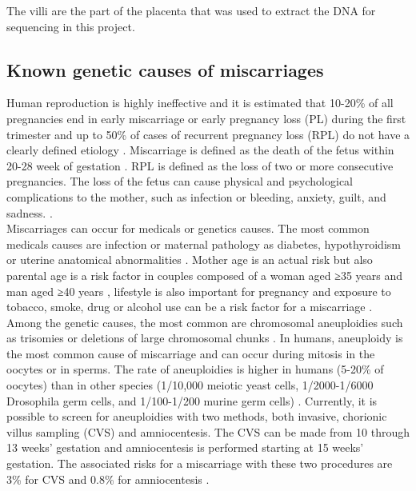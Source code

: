 The villi are the part of the placenta that was used to extract the DNA \cite{you2008multiple} for sequencing in this project. 


\subsection{Known genetic causes of miscarriages}
Human reproduction is highly ineffective and it is estimated that 10-20\% of all pregnancies end in early miscarriage or early pregnancy loss (PL) during the first trimester \cite{goddijn2000genetic,zhang2009genetic} and up to 50\% of cases of recurrent pregnancy loss (RPL) do not have a clearly defined etiology \cite{practice2012evaluation}. Miscarriage is defined as the death of the fetus within 20-28 week of gestation \cite{pmid27994187, pmid25055407, pmid25944391, pmid11821293, stephenson2002cytogenetic, pmid25681385, pmid29858908}. RPL is defined as the loss of two or more consecutive pregnancies\cite{green2019review}. 
The loss of the fetus can cause physical and psychological complications to the mother, such as infection or bleeding, anxiety, guilt, and sadness. \cite{robinson2014pregnancy}.\\ 

Miscarriages can occur for medicals or genetics causes. The most common medicals causes are infection or maternal pathology as diabetes, hypothyroidism or uterine anatomical abnormalities \cite{najafi2019chromosomal}. Mother age is an actual risk but also parental age is a risk factor in couples composed of a woman aged ≥35 years and man aged ≥40 years \cite{de2002paternal}, lifestyle is also important for pregnancy and exposure to tobacco, smoke, drug or alcohol use can be a risk factor for a miscarriage \cite{andersen2014risk}.\\

Among the genetic causes, the most common are chromosomal aneuploidies such as trisomies or deletions of large chromosomal chunks \cite{goddijn2000genetic,zhang2009genetic}. In humans, aneuploidy is the most common cause of miscarriage and can occur during mitosis in the oocytes or in sperms. The rate of aneuploidies is higher in humans (5-20\% of oocytes) than in other species (1/10,000 meiotic yeast cells, 1/2000-1/6000 Drosophila germ cells, and 1/100-1/200 murine germ cells) \cite{niakan2012human}.
Currently, it is possible to screen for aneuploidies with two methods, both invasive, chorionic villus sampling (CVS) and amniocentesis. The CVS can be made from 10 through 13 weeks’ gestation and amniocentesis is performed starting at 15 weeks’ gestation. The associated risks for a miscarriage with these two procedures are 3\% for CVS and 0.8\% for amniocentesis \cite{caughey2006chorionic}.\\

